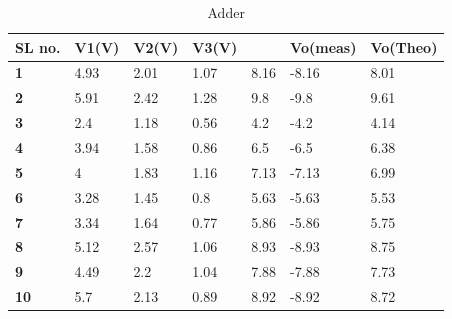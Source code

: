 \documentclass{scrartcl}
\newcommand{\1}{\mathbbm{1}}
\begin{document}
\begin{table}[!ht]
    \centering
    \caption{Adder}
    \begin{tabular}{|l|l|l|l|l|l|l|}
    \hline
        \textbf{SL no.} & \textbf{V1(V)} & \textbf{V2(V)} & \textbf{V3(V)} & \textbf{} & \textbf{Vo(meas)} & \textbf{Vo(Theo)} \\ \hline
        \textbf{1} & 4.93 & 2.01 & 1.07 & 8.16 & -8.16 & 8.01 \\ \hline
        \textbf{2} & 5.91 & 2.42 & 1.28 & 9.8 & -9.8 & 9.61 \\ \hline
        \textbf{3} & 2.4 & 1.18 & 0.56 & 4.2 & -4.2 & 4.14 \\ \hline
        \textbf{4} & 3.94 & 1.58 & 0.86 & 6.5 & -6.5 & 6.38 \\ \hline
        \textbf{5} & 4 & 1.83 & 1.16 & 7.13 & -7.13 & 6.99 \\ \hline
        \textbf{6} & 3.28 & 1.45 & 0.8 & 5.63 & -5.63 & 5.53 \\ \hline
        \textbf{7} & 3.34 & 1.64 & 0.77 & 5.86 & -5.86 & 5.75 \\ \hline
        \textbf{8} & 5.12 & 2.57 & 1.06 & 8.93 & -8.93 & 8.75 \\ \hline
        \textbf{9} & 4.49 & 2.2 & 1.04 & 7.88 & -7.88 & 7.73 \\ \hline
        \textbf{10} & 5.7 & 2.13 & 0.89 & 8.92 & -8.92 & 8.72 \\ \hline
    \end{tabular}
    \label{adder}
\end{table}
\end{document}
